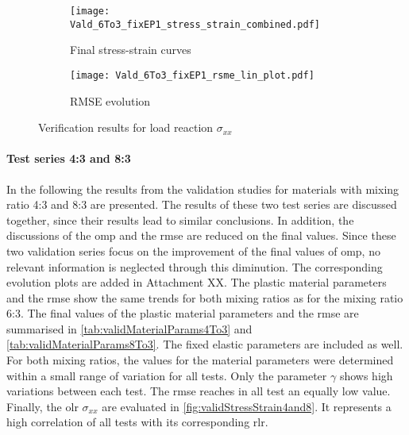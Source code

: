 \begin{figure}[H]
\centering
\begin{subfigure}[t]{0.495\textwidth}
    \centering
    \texttt{[image: Vald\_6To3\_fixEP1\_stress\_strain\_combined.pdf]}
    \caption{ Final stress-strain curves}
    \label{fig:validStressStrain6to3}
\end{subfigure}
\hfill
\begin{subfigure}[t]{0.495\textwidth}
    \centering
    \centering
    \texttt{[image: Vald\_6To3\_fixEP1\_rsme\_lin\_plot.pdf]}
    \caption{RMSE evolution}
    \label{fig:validRMSE6to3}
\end{subfigure}
\caption{Verification results for load reaction $\sigma_{xx}$}
\label{fig:validRes6to3}
\end{figure}





\paragraph{Test series 4:3 and 8:3}
In the following the results from the validation studies for materials with mixing ratio 4:3 and 8:3 are presented. The results of these two test series are discussed together, since their results lead to similar conclusions. In addition, the discussions of the \acrlong{omp} and the \acrshort{rmse} are reduced on the final values. Since these two validation series focus on the improvement of the final values of \acrlong{omp}, no relevant information is neglected through this diminution. The corresponding evolution plots are added in Attachment XX. The plastic material parameters and the \acrshort{rmse} show the same trends for both mixing ratios as for the mixing ratio 6:3. The final values of the plastic material parameters and the \acrshort{rmse} are summarised in \autoref{tab:validMaterialParams4To3} and \autoref{tab:validMaterialParams8To3}. The fixed elastic parameters are included as well. 
For both mixing ratios, the values for the material parameters were determined within a small range of variation for all tests. Only the parameter $\gamma$ shows high variations between each test. The \acrshort{rmse} reaches in all test an equally low value. Finally, the \acrlong{olr} $\sigma_{xx}$ are evaluated in \autoref{fig:validStressStrain4and8}. It represents a high correlation of all tests with its corresponding \acrlong{rlr}.

